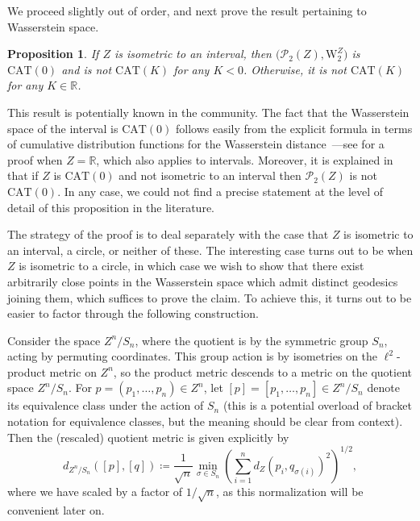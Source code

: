 \documentclass{article}
\newtheorem{proposition}{Proposition}[section]
\theoremstyle{definition}
\newcommand{\R}{\mathbb{R}}
\newcommand{\WZp}[1]{\mathcal{P}_{#1}(Z)}
\newcommand{\wzp}[1]{\mathrm{W}_{#1}^Z}
\begin{document}
We proceed slightly out of order, and next prove the result pertaining to Wasserstein space.

\begin{proposition}\label{prop:upper_curvature_wasserstein}
    If $Z$ is isometric to an interval, then $\big(\WZp{2},\wzp{2})$ is $\mathrm{CAT}(0)$ and is not $\mathrm{CAT}(K)$ for any $K<0$. Otherwise, it is not $\mathrm{CAT}(K)$ for any $K \in \R$.  
\end{proposition}

%
%
%
%
%
%
%
%
%

%
%
%
%
%
%
%
%
%
%
%
%
%
%
%
%
%
%
%
%
%
%

This result is potentially known in the community. The fact that the Wasserstein space of the interval is $\mathrm{CAT}(0)$ follows easily from the explicit formula in terms of cumulative distribution functions for the Wasserstein distance~\cite[Chapter 2]{santambrogio2015optimal}---see \cite[Proposition 4.1]{kloeckner2010geometric} for a proof when $Z=\R$, which also applies to intervals. Moreover, it is explained in \cite[Remark 2.10]{bertrand2012geometric} that if $Z$ is $\mathrm{CAT}(0)$ and not isometric to an interval then $\WZp{2}$ is not $\mathrm{CAT}(0)$. In any case, we could not find a precise statement at the level of detail of this proposition in the literature.

The strategy of the proof is to  deal separately with the case that $Z$ is isometric to an interval, a circle, or neither of these. The interesting case turns out to be when $Z$ is isometric to a circle, in which case we wish to show that there exist arbitrarily close points in the Wasserstein space which admit distinct geodesics joining them, which suffices to prove the claim. To achieve this, it turns out to be easier to factor through the following construction.

%
Consider the space $Z^n/ S_n$, where the quotient is by the symmetric group $S_n$, acting by permuting coordinates. This group action is by isometries on the $\ell^2$-product metric on $Z^n$, so the product metric descends to a metric on the quotient space $Z^n/S_n$. For $p = (p_1,\ldots,p_n) \in Z^n$, let $[p] = [p_1,\ldots,p_n] \in Z^n/S_n$ denote its equivalence class under the action of $S_n$ (this is a potential overload of bracket notation for equivalence classes, but the meaning should be clear from context). Then the (rescaled) quotient metric is given explicitly by 
\begin{equation}\label{eqn:symmetric_product_metric}
d_{Z^n/S_n}([p],[q]) \coloneqq \frac{1}{\sqrt{n}} \min_{\sigma \in S_n} \left(\sum_{i=1}^n d_Z(p_i, q_{\sigma(i)})^2 \right)^{1/2},
\end{equation}
where we have scaled by a factor of $1/\sqrt{n}$, as this normalization will be convenient later on.
\end{document}
